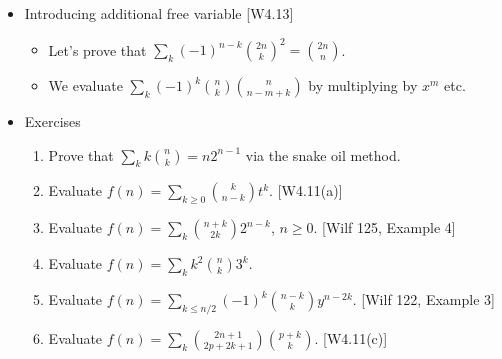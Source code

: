 \documentclass[10pt, a4paper]{article}
\def\ans#1{\big[\hskip 2mm {#1}\hskip 2mm\big]}
\begin{document}
\begin{itemize}
\item 
Introducing additional free variable [W4.13]
\begin{itemize}
    \item Let's prove that $\sum_k (-1)^{n-k}{2n\choose k}^2={2n\choose n}$.
    \item We evaluate $\sum_k (-1)^k{n\choose k}{n\choose n-m+k}$ by multiplying by $x^m$ etc. %
\end{itemize}

\item
Exercises
\begin{enumerate}
    \item Prove that $\sum_k k{n\choose k} = n2^{n-1}$ via the snake oil method.
            \ans{$L(x) = P(x) = {x\over (1-2x)^2}$}
    \item Evaluate $\displaystyle f(n)=\sum_{k\ge 0} {k\choose n-k}t^k$. [W4.11(a)] \\[2mm]
            \ans{$F(x)=1/(1-tx+x^2)$}
    \item Evaluate $\displaystyle f(n)=\sum_k {n+k\choose 2k}2^{n-k}$, $n\ge 0$. [Wilf 125, Example 4] \\[2mm]
            \ans{$F(x)={1-2x\over (1-x)(1-4x)}={2\over 3(1-4x)}+{1\over 3(1-x)}$; $f(n)=(2^{2n+1}+1)/3$}
    \item Evaluate $\displaystyle f(n)=\sum_k k^2{n\choose k}3^k$. \\[2mm]
            \ans{$F(x)={3x(1+2x)\over (1-4x)^3}={3/8\over 1-4x}-{3/2\over (1-4x)^2}+{9/8\over (1-4x)^3}$; $f(n)=3\cdot 4^{n-2}\cdot n(1+3n)$}
    \item Evaluate $\displaystyle f(n)=\sum_{k\le n/2} (-1)^k{n-k\choose k}y^{n-2k}$. [Wilf 122, Example 3]\\[2mm]
            \ans{$F(x)=1/(1-xy+x^2)$}
    \item Evaluate $\displaystyle f(n)=\sum_{k} {2n+1\choose 2p+2k+1}{p+k\choose k}$. [W4.11(c)]\\[2mm]
            \ans{replace $2n+1$ by $m$ and solve for $f(m)={m-p-1\choose p}2^{m-2p-1}$;  $f(2n+1)={2n-p\choose p}4^{n-p}$;\\[2mm]
                    $\displaystyle F(x) = {x\over (1-x)^2}\sum_{k\ge 0} {p+k\choose p} \left({x\over 1-x}\right)^{2(p+k)}
                    ={x^{p+1}\over 2^p}\cdot {(2x)^p\over (1-2x)^{p+1}}$}
\end{enumerate}

\end{itemize}


\newpage
\end{document}
